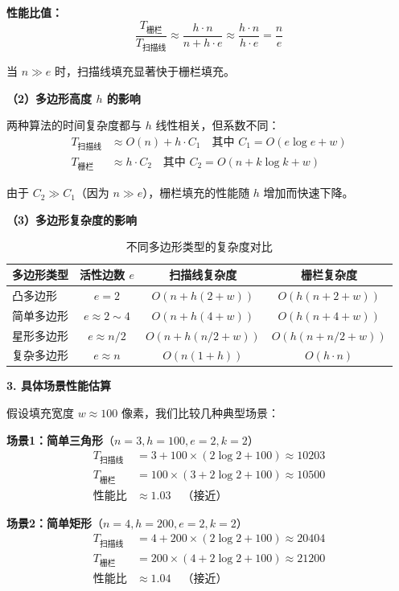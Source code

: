 ﻿\documentclass[12pt,a4paper]{article}
\begin{document}
\textbf{性能比值：}
\begin{equation}
\frac{T_{栅栏}}{T_{扫描线}} \approx \frac{h \cdot n}{n + h \cdot e} \approx \frac{h \cdot n}{h \cdot e} = \frac{n}{e}
\end{equation}

当 $n \gg e$ 时，扫描线填充显著快于栅栏填充。

\textbf{（2）多边形高度 $h$ 的影响}

两种算法的时间复杂度都与 $h$ 线性相关，但系数不同：
\begin{align}
T_{扫描线} &\approx O(n) + h \cdot C_1 \quad \text{其中 } C_1 = O(e \log e + w) \\
T_{栅栏} &\approx h \cdot C_2 \quad \text{其中 } C_2 = O(n + k \log k + w)
\end{align}

由于 $C_2 \gg C_1$（因为 $n \gg e$），栅栏填充的性能随 $h$ 增加而快速下降。

\textbf{（3）多边形复杂度的影响}

\begin{table}[H]
\centering
\begin{tabular}{|l|c|c|c|}
\hline
\textbf{多边形类型} & \textbf{活性边数 $e$} & \textbf{扫描线复杂度} & \textbf{栅栏复杂度} \\
\hline
凸多边形 & $e = 2$ & $O(n + h(2 + w))$ & $O(h(n + 2 + w))$ \\
\hline
简单多边形 & $e \approx 2\sim 4$ & $O(n + h(4 + w))$ & $O(h(n + 4 + w))$ \\
\hline
星形多边形 & $e \approx n/2$ & $O(n + h(n/2 + w))$ & $O(h(n + n/2 + w))$ \\
\hline
复杂多边形 & $e \approx n$ & $O(n(1 + h))$ & $O(h \cdot n)$ \\
\hline
\end{tabular}
\caption{不同多边形类型的复杂度对比}
\end{table}

\textbf{3. 具体场景性能估算}

假设填充宽度 $w \approx 100$ 像素，我们比较几种典型场景：

\textbf{场景1：简单三角形}（$n=3, h=100, e=2, k=2$）
\begin{align}
T_{扫描线} &= 3 + 100 \times (2 \log 2 + 100) \approx 10203 \\
T_{栅栏} &= 100 \times (3 + 2 \log 2 + 100) \approx 10500 \\
\text{性能比} &\approx 1.03 \quad \text{（接近）}
\end{align}

\textbf{场景2：简单矩形}（$n=4, h=200, e=2, k=2$）
\begin{align}
T_{扫描线} &= 4 + 200 \times (2 \log 2 + 100) \approx 20404 \\
T_{栅栏} &= 200 \times (4 + 2 \log 2 + 100) \approx 21200 \\
\text{性能比} &\approx 1.04 \quad \text{（接近）}
\end{align}
\end{document}
